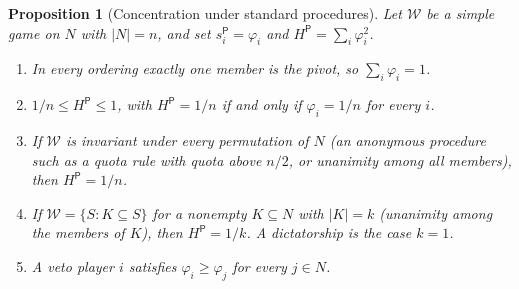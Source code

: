 \documentclass[11pt,letterpaper]{article}
\newtheorem{proposition}[theorem]{Proposition}
\theoremstyle{definition}
\theoremstyle{remark}
\newcommand{\pP}{\mathsf{P}}
\newcommand{\Win}{\mathcal{W}}
\begin{document}
\begin{proposition}[Concentration under standard procedures]
\label{prop:political-power:concentration}
Let $\Win$ be a simple game on $N$ with $|N|=n$, and set $s^{\pP}_i=\varphi_i$ and $H^{\pP}=\sum_i\varphi_i^2$.
\begin{enumerate}[label=(\alph*)]
\item In every ordering exactly one member is the pivot, so $\sum_i\varphi_i=1$.
\item $1/n\le H^{\pP}\le 1$, with $H^{\pP}=1/n$ if and only if $\varphi_i=1/n$ for every $i$.
\item If $\Win$ is invariant under every permutation of $N$ (an anonymous procedure such as a quota rule with quota above $n/2$, or unanimity among all members), then $H^{\pP}=1/n$.
\item If $\Win=\{S: K\subseteq S\}$ for a nonempty $K\subseteq N$ with $|K|=k$ (unanimity among the members of $K$), then $H^{\pP}=1/k$. A dictatorship is the case $k=1$.
\item A veto player $i$ satisfies $\varphi_i\ge\varphi_j$ for every $j\in N$.
\end{enumerate}
\end{proposition}
\end{document}
